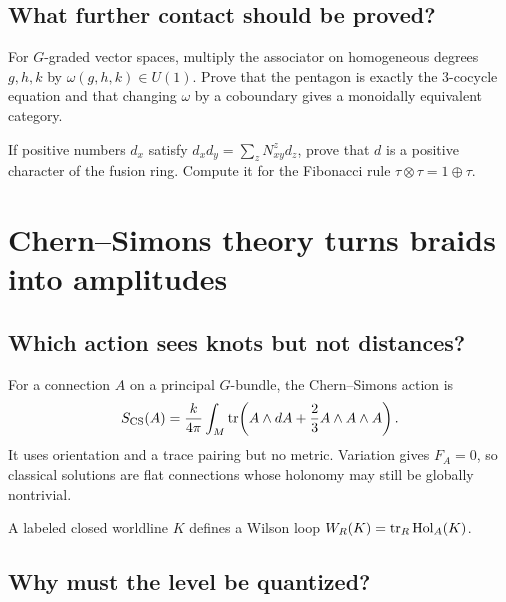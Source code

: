 \section{What further contact should be proved?}

\begin{exercise}
For $G$-graded vector spaces, multiply the associator on homogeneous degrees
$g,h,k$ by $\omega(g,h,k)\in U(1)$.  Prove that the pentagon is exactly the
$3$-cocycle equation and that changing $\omega$ by a coboundary gives a
monoidally equivalent category.
\end{exercise}

\begin{exercise}
If positive numbers $d_x$ satisfy
$d_xd_y=\sum_zN_{xy}^zd_z$, prove that $d$ is a positive character of the
fusion ring.  Compute it for the Fibonacci rule $\tau\otimes\tau=1\oplus\tau$.
\end{exercise}


\chapter{Chern--Simons theory turns braids into amplitudes}
\label{ch:chern-simons}



\section{Which action sees knots but not distances?}

For a connection $A$ on a principal $G$-bundle, the Chern--Simons action is
\[
S_{\mathrm{CS}}(A)
=\frac{k}{4\pi}\int_M
\operatorname{tr}\!\left(A\wedge dA+\frac23A\wedge A\wedge A\right).
\]
It uses orientation and a trace pairing but no metric.  Variation gives
$F_A=0$, so classical solutions are flat connections whose holonomy may still
be globally nontrivial.

A labeled closed worldline $K$ defines a Wilson loop
$W_R(K)=\operatorname{tr}_R\operatorname{Hol}_A(K)$.

\section{Why must the level be quantized?}


